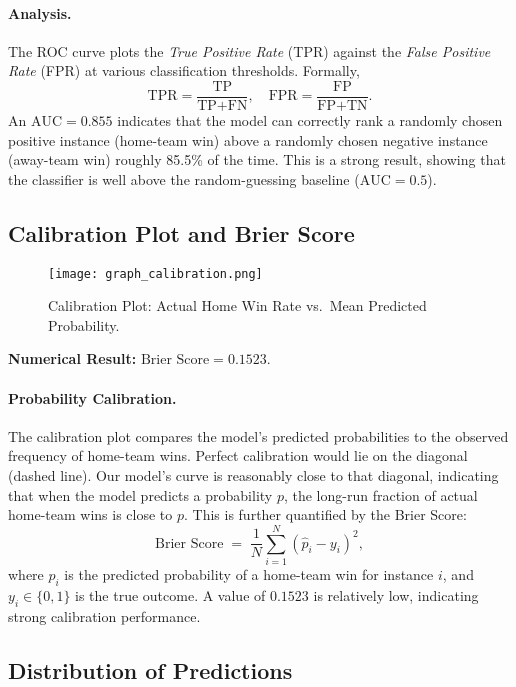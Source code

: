 \documentclass[12pt]{article}
\begin{document}
\paragraph{Analysis.}
The ROC curve plots the \textit{True Positive Rate} (TPR) against the \textit{False Positive Rate} (FPR) at various classification thresholds. Formally,
\[
\text{TPR} = \frac{\text{TP}}{\text{TP} + \text{FN}}, 
\quad
\text{FPR} = \frac{\text{FP}}{\text{FP} + \text{TN}}.
\]
An \(\text{AUC} = 0.855\) indicates that the model can correctly rank a randomly chosen positive instance (home-team win) above a randomly chosen negative instance (away-team win) roughly 85.5\% of the time. This is a strong result, showing that the classifier is well above the random-guessing baseline (\(\text{AUC} = 0.5\)).

\subsection{Calibration Plot and Brier Score}

\begin{figure}[H]
\centering
\texttt{[image: graph\_calibration.png]}
\caption{Calibration Plot: Actual Home Win Rate vs.\ Mean Predicted Probability.}
\label{fig:calibration}
\end{figure}

\noindent
\textbf{Numerical Result:} \(\text{Brier Score} = 0.1523.\)

\paragraph{Probability Calibration.}
The calibration plot compares the model’s predicted probabilities to the observed frequency of home-team wins. Perfect calibration would lie on the diagonal (dashed line). Our model’s curve is reasonably close to that diagonal, indicating that when the model predicts a probability \(p\), the long-run fraction of actual home-team wins is close to \(p\). This is further quantified by the Brier Score:
\[
\text{Brier Score} 
\;=\;
\frac{1}{N}\sum_{i=1}^N (\hat{p}_i - y_i)^2,
\]
where \(\hat{p}_i\) is the predicted probability of a home-team win for instance \(i\), and \(y_i \in \{0,1\}\) is the true outcome. A value of \(0.1523\) is relatively low, indicating strong calibration performance.

\subsection{Distribution of Predictions}
\end{document}
